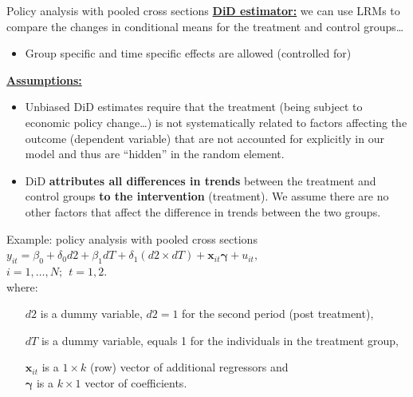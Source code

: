 \documentclass[usenames,dvipsnames]{beamer}
\begin{document}
\begin{frame}{Policy analysis with pooled cross sections}
\underline{\textbf{DiD estimator:}} we can use LRMs to compare the changes in conditional means for the treatment and control groups…
\begin{itemize}
\item Group specific and time specific effects are allowed (controlled for)
\end{itemize}
\underline{\textbf{Assumptions:}}
\begin{itemize}
\item Unbiased DiD estimates require that the treatment (being subject to economic policy change…) is not systematically
related to factors affecting the outcome (dependent variable) that are not accounted for explicitly in our model and
thus are “hidden” in the random element.
\item DiD \textbf{attributes all differences in trends} between the treatment and control groups \textbf{to the intervention} (treatment). We assume there are no other factors that affect the difference in trends between the two groups.
\end{itemize}
\end{frame}
\begin{frame}{Example: policy analysis with pooled cross sections}
$y_{it}=\beta_0 + \delta_0 d2 + \beta_1 dT + \delta_1 (d2 \times dT) + \bm{x}_{it} \bm{\gamma} + u_{it},$\\
\medskip
$i=1, \dots, N;~~t=1,2$. \\
\bigskip
where:
\begin{itemize}
\item[$d2$] is a dummy variable, $d2=1$ for the second period (post treatment),
\item[$dT$] is a dummy variable, equals 1 for the individuals in the treatment group,
\item[$\bm{x}_{it}$ ] is a $1 \times k$ (row) vector of additional regressors and \\
$\bm{\gamma}$ is a $k \times 1$ vector of coefficients.
\end{itemize}
\end{frame}
\end{document}

